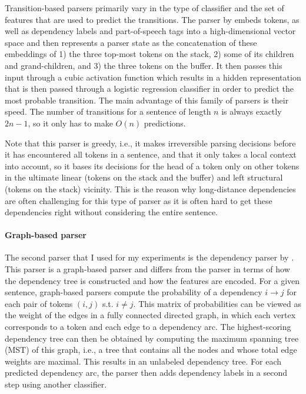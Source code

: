 \documentclass[lucida,biblatex]{sp} %
\begin{document}
Transition-based parsers primarily vary in the type of classifier and the set of features that are used to predict the transitions. The parser by \textcite{Chen2014} embeds tokens, as well as dependency labels and part-of-speech tags into a high-dimensional vector space and then represents a parser state as the concatenation of these embeddings of 1) the three top-most tokens on the stack, 2) some of its children and grand-children, and 3) the three tokens on the buffer. It then passes this input through a cubic activation function which results in a hidden representation that is then passed through a logistic regression classifier in order to predict the most probable transition. The main advantage of this family of parsers is their speed. The number of transitions for a sentence of length $n$ is always exactly $2n-1$, so it only has to make $O(n)$ predictions.

Note that this parser is greedy, i.e., it makes irreversible parsing decisions before it has encountered all tokens in a sentence, and that it only takes a local context into account, so it bases its decisions for the head of a token only on other tokens in the ultimate linear (tokens on the stack and the buffer) and left structural (tokens on the stack) vicinity. This is the reason why long-distance dependencies are often challenging for this type of parser as it is often hard to get these dependencies right without considering the entire sentence.

\paragraph{Graph-based parser}

The second parser that I used for my experiments is the dependency parser by \textcite{Dozat2017}. This parser is a graph-based parser and differs from the \textcite{Chen2014} parser in terms of how the dependency tree is constructed and how the features are encoded. For a given sentence, graph-based parsers compute the probability of a dependency $i\rightarrow j$ for each pair of tokens $(i, j)$ s.t. $i\ne j$. This matrix of probabilities can be viewed as the weight of the edges in a fully connected directed graph, in which each vertex corresponds to a token and each edge to a dependency arc. The highest-scoring dependency tree  can then be obtained by computing the maximum spanning tree (MST) of this graph, i.e., a tree that contains all the nodes and whose  total edge weights are maximal. This results in an unlabeled dependency tree. For each predicted dependency arc, the parser then adds dependency labels in a second step using another classifier.
\end{document}
